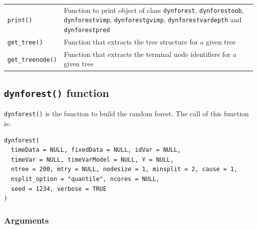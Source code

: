 \begin{longtable}[]{@{}
  >{\raggedright\arraybackslash}p{}
  >{\raggedright\arraybackslash}p{}@{}}
\texttt{print()} & Function to print object of class \texttt{dynforest}, \texttt{dynforestoob}, \texttt{dynforestvimp}, \texttt{dynforestgvimp}, \texttt{dynforestvardepth} and \texttt{dynforestpred} \\
\texttt{get\_tree()} & Function that extracts the tree structure for a given tree \\
\texttt{get\_treenode()} & Function that extracts the terminal node identifiers for a given tree \\
\end{longtable}

\subsection{\texorpdfstring{\texttt{dynforest()} function}{dynforest() function}}\label{dynforest-function}

\texttt{dynforest()} is the function to build the random forest. The call of this function is:

\begin{verbatim}
dynforest(
  timeData = NULL, fixedData = NULL, idVar = NULL,
  timeVar = NULL, timeVarModel = NULL, Y = NULL,
  ntree = 200, mtry = NULL, nodesize = 1, minsplit = 2, cause = 1,
  nsplit_option = "quantile", ncores = NULL,
  seed = 1234, verbose = TRUE
)
\end{verbatim}

\subsubsection{Arguments}\label{arguments}

